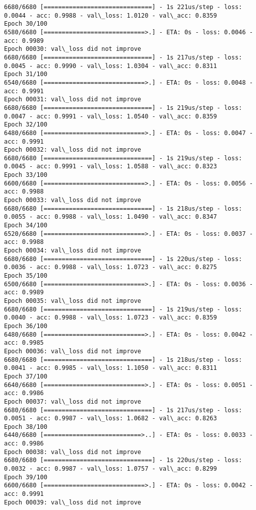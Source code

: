 \documentclass[11pt]{article}
\begin{document}
\begin{Verbatim}[commandchars=\\\{\}]
6680/6680 [==============================] - 1s 221us/step - loss: 0.0044 - acc: 0.9988 - val\_loss: 1.0120 - val\_acc: 0.8359
Epoch 30/100
6580/6680 [============================>.] - ETA: 0s - loss: 0.0046 - acc: 0.9989
Epoch 00030: val\_loss did not improve
6680/6680 [==============================] - 1s 217us/step - loss: 0.0045 - acc: 0.9990 - val\_loss: 1.0304 - val\_acc: 0.8311
Epoch 31/100
6540/6680 [============================>.] - ETA: 0s - loss: 0.0048 - acc: 0.9991
Epoch 00031: val\_loss did not improve
6680/6680 [==============================] - 1s 219us/step - loss: 0.0047 - acc: 0.9991 - val\_loss: 1.0540 - val\_acc: 0.8359
Epoch 32/100
6480/6680 [============================>.] - ETA: 0s - loss: 0.0047 - acc: 0.9991
Epoch 00032: val\_loss did not improve
6680/6680 [==============================] - 1s 219us/step - loss: 0.0045 - acc: 0.9991 - val\_loss: 1.0588 - val\_acc: 0.8323
Epoch 33/100
6600/6680 [============================>.] - ETA: 0s - loss: 0.0056 - acc: 0.9988
Epoch 00033: val\_loss did not improve
6680/6680 [==============================] - 1s 218us/step - loss: 0.0055 - acc: 0.9988 - val\_loss: 1.0490 - val\_acc: 0.8347
Epoch 34/100
6520/6680 [============================>.] - ETA: 0s - loss: 0.0037 - acc: 0.9988
Epoch 00034: val\_loss did not improve
6680/6680 [==============================] - 1s 220us/step - loss: 0.0036 - acc: 0.9988 - val\_loss: 1.0723 - val\_acc: 0.8275
Epoch 35/100
6500/6680 [============================>.] - ETA: 0s - loss: 0.0036 - acc: 0.9989
Epoch 00035: val\_loss did not improve
6680/6680 [==============================] - 1s 219us/step - loss: 0.0040 - acc: 0.9988 - val\_loss: 1.0723 - val\_acc: 0.8359
Epoch 36/100
6480/6680 [============================>.] - ETA: 0s - loss: 0.0042 - acc: 0.9985
Epoch 00036: val\_loss did not improve
6680/6680 [==============================] - 1s 218us/step - loss: 0.0041 - acc: 0.9985 - val\_loss: 1.1050 - val\_acc: 0.8311
Epoch 37/100
6640/6680 [============================>.] - ETA: 0s - loss: 0.0051 - acc: 0.9986
Epoch 00037: val\_loss did not improve
6680/6680 [==============================] - 1s 217us/step - loss: 0.0051 - acc: 0.9987 - val\_loss: 1.0682 - val\_acc: 0.8263
Epoch 38/100
6440/6680 [===========================>..] - ETA: 0s - loss: 0.0033 - acc: 0.9986
Epoch 00038: val\_loss did not improve
6680/6680 [==============================] - 1s 220us/step - loss: 0.0032 - acc: 0.9987 - val\_loss: 1.0757 - val\_acc: 0.8299
Epoch 39/100
6600/6680 [============================>.] - ETA: 0s - loss: 0.0042 - acc: 0.9991
Epoch 00039: val\_loss did not improve

\end{Verbatim}
\end{document}
